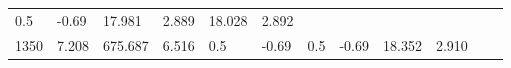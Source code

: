 \documentclass{article}
\begin{document}
\begin{longtable}[]{@{}llllllllllll@{}}
\begin{minipage}[t]{0.03\columnwidth}
0.5\strut
\end{minipage} & \begin{minipage}[t]{0.06\columnwidth}\raggedright\strut
-0.69\strut
\end{minipage} & \begin{minipage}[t]{0.06\columnwidth}\raggedright\strut
17.981\strut
\end{minipage} & \begin{minipage}[t]{0.08\columnwidth}\raggedright\strut
2.889\strut
\end{minipage} & \begin{minipage}[t]{0.06\columnwidth}\raggedright\strut
18.028\strut
\end{minipage} & \begin{minipage}[t]{0.09\columnwidth}\raggedright\strut
2.892\strut
\end{minipage}\tabularnewline
\begin{minipage}[t]{0.03\columnwidth}\raggedright\strut
1350\strut
\end{minipage} & \begin{minipage}[t]{0.06\columnwidth}\raggedright\strut
7.208\strut
\end{minipage} & \begin{minipage}[t]{0.06\columnwidth}\raggedright\strut
675.687\strut
\end{minipage} & \begin{minipage}[t]{0.08\columnwidth}\raggedright\strut
6.516\strut
\end{minipage} & \begin{minipage}[t]{0.03\columnwidth}\raggedright\strut
0.5\strut
\end{minipage} & \begin{minipage}[t]{0.06\columnwidth}\raggedright\strut
-0.69\strut
\end{minipage} & \begin{minipage}[t]{0.03\columnwidth}\raggedright\strut
0.5\strut
\end{minipage} & \begin{minipage}[t]{0.06\columnwidth}\raggedright\strut
-0.69\strut
\end{minipage} & \begin{minipage}[t]{0.06\columnwidth}\raggedright\strut
18.352\strut
\end{minipage} & \begin{minipage}[t]{0.08\columnwidth}\raggedright\strut
2.910\strut
\end{minipage} & \begin{minipage}[t]{0.06\columnwidth}\raggedright\strut

\end{minipage}
\end{longtable}
\end{document}
